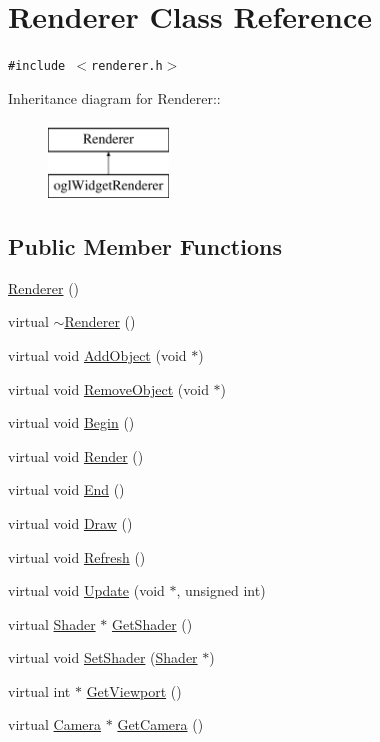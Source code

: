 \hypertarget{class_renderer}{
\section{Renderer Class Reference}
\label{class_renderer}
}
{\tt \#include $<$renderer.h$>$}

Inheritance diagram for Renderer::\begin{figure}[H]
\begin{center}
\leavevmode
\includegraphics[height=2cm]{class_renderer}
\end{center}
\end{figure}
\subsection*{Public Member Functions}
\begin{CompactItemize}
\item 
\hyperlink{class_renderer_7ebf46f54dab9905f79b80f7fddb76a6}{Renderer} ()
\item 
virtual \hyperlink{class_renderer_ba42b60392775e4a492c4d14d4fff29f}{$\sim$Renderer} ()
\item 
virtual void \hyperlink{class_renderer_661389d49db8d9508f5a3f9f91d48149}{AddObject} (void $\ast$)
\item 
virtual void \hyperlink{class_renderer_28f5bf024a4772cff537683690f62f42}{RemoveObject} (void $\ast$)
\item 
virtual void \hyperlink{class_renderer_7f24c7de101eff6bd26906c0555f8610}{Begin} ()
\item 
virtual void \hyperlink{class_renderer_ae3d98a69fb55e9042306ba1621cd8d5}{Render} ()
\item 
virtual void \hyperlink{class_renderer_d08d100b0c4d2f57417a06ceaaa2ba4e}{End} ()
\item 
virtual void \hyperlink{class_renderer_91f20cf8d7e9d12db1725cc15ca16d96}{Draw} ()
\item 
virtual void \hyperlink{class_renderer_025a064cb583ac6677a4b9a6099e0378}{Refresh} ()
\item 
virtual void \hyperlink{class_renderer_d2d2554ed238ba29baa9ffd6b3530ba4}{Update} (void $\ast$, unsigned int)
\item 
virtual \hyperlink{class_shader}{Shader} $\ast$ \hyperlink{class_renderer_85ce8b768250bd767b019f8283a9d46b}{GetShader} ()
\item 
virtual void \hyperlink{class_renderer_d2e8b81f3a9eabfb39f9f046d0f3d3ca}{SetShader} (\hyperlink{class_shader}{Shader} $\ast$)
\item 
virtual int $\ast$ \hyperlink{class_renderer_9a93f4e3bad254923c0dc2810e658dd6}{GetViewport} ()
\item 
virtual \hyperlink{class_camera}{Camera} $\ast$ \hyperlink{class_renderer_527858930942368379414c1be75b5738}{GetCamera} ()
\end{CompactItemize}
